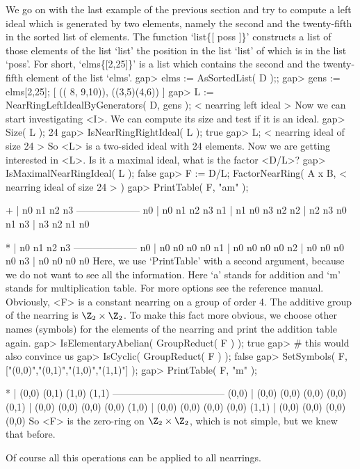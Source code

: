 

        We go on with the last example of the previous section and try to
        compute a left ideal which is generated by two elements, namely the
        second and the twenty-fifth in the sorted list of elements. The {\GAP}
        function `list\{[ poss ]\}' constructs a list of those elements
        of the list `list' the position in the list `list' of which is
        in the list `poss'. For short, `elms\{[2,25]\}' is a list which
        contains the second and the twenty-fifth element of the list `elms'.
\beginexample
    gap> elms := AsSortedList( D );;
    gap> gens := elms{[2,25]};
    [ (( 8, 9,10)), ((3,5)(4,6)) ]
    gap> L := NearRingLeftIdealByGenerators( D, gens );
    < nearring left ideal >
\endexample
        Now we can start investigating <I>. We can compute its size and test
        if it is an ideal.
\beginexample
    gap> Size( L );
    24
    gap> IsNearRingRightIdeal( L );
    true
    gap> L;
    < nearring ideal of size 24 >
\endexample
        So <L> is a two-sided ideal with 24 elements. Now we are getting
        interested in <L>. Is it a maximal ideal, what is the factor <D/L>?
\beginexample
    gap> IsMaximalNearRingIdeal( L );
    false
    gap> F := D/L;
    FactorNearRing( A x B, < nearring ideal of size 24 > )
    gap> PrintTable( F, "am" );

       +  | n0  n1  n2  n3  
      --------------------
      n0  | n0  n1  n2  n3  
      n1  | n1  n0  n3  n2  
      n2  | n2  n3  n0  n1  
      n3  | n3  n2  n1  n0  

       *  | n0  n1  n2  n3  
      --------------------
      n0  | n0  n0  n0  n0  
      n1  | n0  n0  n0  n0  
      n2  | n0  n0  n0  n0  
      n3  | n0  n0  n0  n0  
\endexample
        Here, we use `PrintTable' with a second argument, because we do 
        not want to see all the information. Here `a' stands for addition and `m' 
        stands for multiplication table. For more options see the reference 
        manual. Obviously, <F> is a constant nearring on a group of order 4. 
        The additive group of the nearring is $\Z_2 \times \Z_2$. To make this
        fact more obvious, we choose other names (symbols) for the elements
        of the nearring and print the addition table again.
\beginexample
    gap> IsElementaryAbelian( GroupReduct( F ) );
    true
    gap> # this would also convince us
    gap> IsCyclic( GroupReduct( F ) );
    false
    gap> SetSymbols( F, ["(0,0)","(0,1)","(1,0)","(1,1)"] );
    gap> PrintTable( F, "m" );                             

          *  | (0,0)  (0,1)  (1,0)  (1,1)  
      -----------------------------------
      (0,0)  | (0,0)  (0,0)  (0,0)  (0,0)  
      (0,1)  | (0,0)  (0,0)  (0,0)  (0,0)  
      (1,0)  | (0,0)  (0,0)  (0,0)  (0,0)  
      (1,1)  | (0,0)  (0,0)  (0,0)  (0,0)  
\endexample
        So <F> is the zero-ring on $\Z_2 \times \Z_2$, which is not simple,
        but we knew that before.

        Of course all this operations can be applied to all nearrings.

